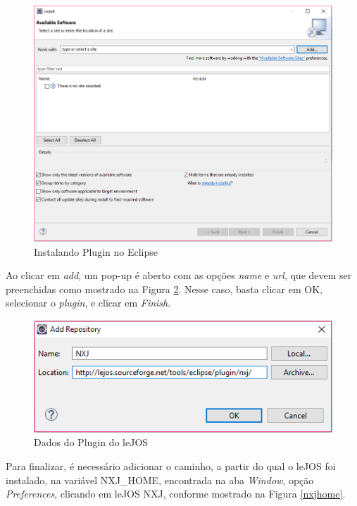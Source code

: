 \FloatBarrier
\begin{figure}[!h]
\centering
\includegraphics[keepaspectratio=true,scale=0.7]{figuras/installNewSoftware.png}
\caption{Instalando Plugin no Eclipse}
\label{installNewSoftware}
\end{figure}

	Ao clicar em \textit{add}, um pop-up é aberto com as opções \textit{name} e \textit{url}, que devem ser preenchidas como mostrado na Figura \ref{pluginNXJ}. Nesse caso, basta clicar em OK, selecionar o \textit{plugin}, e clicar em \textit{Finish}.  

\FloatBarrier
\begin{figure}[!h]
\centering
\includegraphics[keepaspectratio=true,scale=0.8]{figuras/pluginNXJ.png}
\caption{Dados do Plugin do leJOS}
\label{pluginNXJ}
\end{figure}
	
	Para finalizar, é necessário adicionar o caminho, a partir do qual o leJOS foi instalado, na variável NXJ\_HOME, encontrada na aba \textit{Window}, opção \textit{Preferences}, clicando em leJOS NXJ, conforme mostrado na Figura \ref{nxjhome}.
\clearpage

